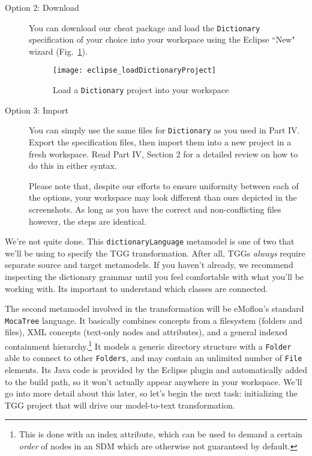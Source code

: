 \begin{description}
\item[Option 2: Download] You can download our cheat package and load the \texttt{Dictionary} specification of your choice into your workspace using
the Eclipse ``New" wizard (Fig.~\ref{eclipse_cheatPackage}).

\vspace{0.5cm}

\begin{figure}[htbp]
\begin{center}
  \texttt{[image: eclipse\_loadDictionaryProject]}
  \caption{Load a \texttt{Dictionary} project into your workspace}
  \label{eclipse_cheatPackage}
\end{center}
\end{figure}

\vspace{0.5cm}

\item[Option 3: Import] You can simply use the same files for \texttt{Dictionary} as you used in Part IV. Export the specification files, then import them
into a new project in a fresh workspace. Read Part IV, Section 2 for a detailed review on how to do this in either syntax.

\vspace{0.5cm}

Please note that, despite our efforts to ensure uniformity between each of the options, your workspace may look different than ours depicted in the
screenshots. As long as you have the correct and non-conflicting files however, the steps are identical.

\end{description} 

\newpage

We're not quite done. This \texttt{dictionaryLanguage} metamodel is one of two that we'll be using to specify the TGG transformation. After all, TGGs
\emph{always} require separate source and target metamodels. If you haven't already, we recommend inspecting the dictionary grammar until you feel comfortable
with what you'll be working with. Its important to understand which classes are connected.

The second metamodel involved in the transformation will be eMoflon's standard \texttt{MocaTree} language. It basically combines concepts from a filesystem
(folders and files), XML concepts (text-only nodes and attributes), and a general indexed containment hierarchy.\footnote{This is done with an index attribute,
which can be used to demand a certain \emph{order} of nodes in an SDM which are otherwise not guaranteed by default.} It models a generic directory structure
with a \texttt{Folder} able to connect to other \texttt{Folders}, and may contain an unlimited number of \texttt{File} elements. Its Java code is provided by
the Eclipse plugin and automatically added to the build path, so it won't actually appear anywhere in your workspace.  We'll go into more detail about this
later, so let's begin the next task: initializing the TGG project that will drive our model-to-text transformation.







